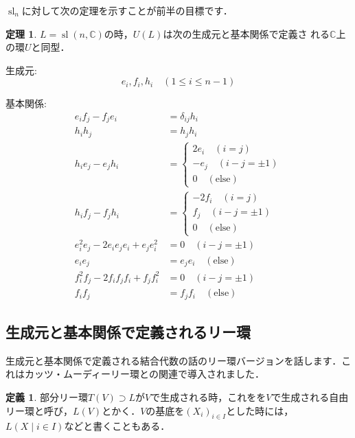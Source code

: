 \documentclass[dvipdfmx,autodetect-engine]{article}
\theoremstyle{definition}
\newtheorem{Def}{定義}
\newtheorem{Th}{定理}
\DeclareMathOperator{\sllie}{sl}
\begin{document}
    $\sllie_n$に対して次の定理を示すことが前半の目標です．
    \begin{Th}
        \label{main1}
        $L = \sllie(n, \mathbb{C})$の時，$U(L)$は次の生成元と基本関係で定義さ
        れる$\mathbb{C}$上の環$U$と同型．
        
        生成元:
        \[
            e_i, f_i, h_i \quad (1 \leq i \leq n-1)
        \]
        
        基本関係:
        \begin{align}
            e_if_j - f_je_i &= \delta_{ij} h_i\\
            h_ih_j  &= h_jh_i\\
            h_ie_j - e_jh_i &= 
            \begin{cases}
                2e_i \quad (i = j)\\
                -e_j \quad (i - j = \pm 1)\\
                0 \quad (\text{else})
            \end{cases}\\
            h_if_j - f_jh_i &= 
            \begin{cases}
                - 2f_i \quad (i = j)\\
                f_j \quad (i - j = \pm 1)\\
                0 \quad (\text{else})
            \end{cases}\\
            e_i^2e_j - 2e_ie_je_i + e_je_i^2 &= 0 \quad (i - j = \pm 1)\\
            e_ie_j &= e_je_i \quad (\text{else})\\
            f_i^2f_j - 2f_if_jf_i + f_jf_i^2 &= 0 \quad (i - j = \pm 1)\\
            f_if_j &= f_jf_i \quad (\text{else})
        \end{align}
    \end{Th}
    
    \subsection{生成元と基本関係で定義されるリー環}
        生成元と基本関係で定義される結合代数の話のリー環バージョンを話します．これはカッツ・ムーディーリー環との関連で導入されました．
        \begin{Def}
            部分リー環$T(V) \supset L$が$V$で生成される時，これをを$V$で生成される自由リー環と呼び，$L(V)$とかく．$V$の基底を$(X_i)_{i \in I}$とした時には，$L(X \mid i \in I)$などと書くこともある．
        \end{Def}
        
\end{document}
